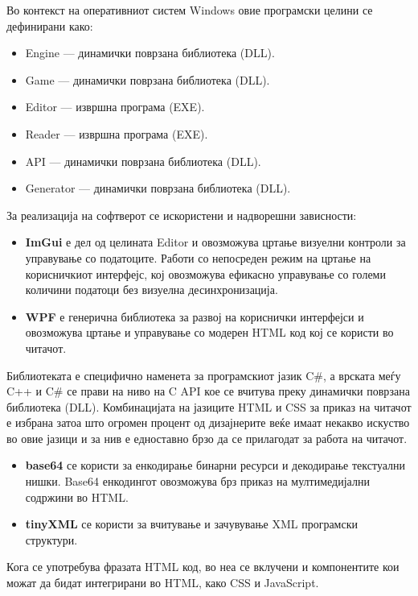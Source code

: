 Во контекст на оперативниот систем Windows овие програмски целини се дефинирани како:

\begin{itemize}
\item Engine — динамички поврзана библиотека (DLL).
\item Game — динамички поврзана библиотека (DLL).
\item Editor — извршна програма (EXE).
\item Reader — извршна програма (EXE).
\item API — динамички поврзана библиотека (DLL).
\item Generator — динамички поврзана библиотека (DLL).
\end{itemize}

За реализација на софтверот се искористени и надворешни зависности:

\begin{itemize}
\item \textbf{ImGui} е дел од целината Editor и овозможува цртање визуелни контроли за управување со податоците. Работи со непосреден режим на цртање на корисничкиот интерфејс, кој овозможува ефикасно управување со големи количини податоци без визуелна десинхронизација.
\item \textbf{WPF} е генерична библиотека за развој на кориснички интерфејси и овозможува цртање и управување со модерен HTML код кој се користи во читачот.
\end{itemize}

Библиотеката е специфично наменета за програмскиот јазик C\#, а врската меѓу C++ и C\# се прави на ниво на C API кое се вчитува преку динамички поврзана библиотека (DLL). Комбинацијата на јазиците HTML и CSS за приказ на читачот е избрана затоа што огромен процент од дизајнерите веќе имаат некакво искуство во овие јазици и за нив е едноставно брзо да се прилагодат за работа на читачот.

\begin{itemize}
\item \textbf{base64} се користи за енкодирање бинарни ресурси и декодирање текстуални нишки. Base64 енкодингот овозможува брз приказ на мултимедијални содржини во HTML.
\item \textbf{tinyXML} се користи за вчитување и зачувување XML програмски структури.
\end{itemize}

Кога се употребува фразата HTML код, во неа се вклучени и компонентите кои можат да бидат интегрирани во HTML, како CSS и JavaScript.

